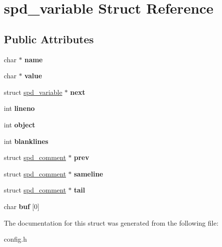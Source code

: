 \hypertarget{structspd__variable}{
\section{spd\_\-variable Struct Reference}
\label{structspd__variable}
}
\subsection*{Public Attributes}
\begin{DoxyCompactItemize}
\item 
\hypertarget{structspd__variable_a9d87b02dc765e30e70edbbe681cb464a}{
char $\ast$ {\bfseries name}}
\label{structspd__variable_a9d87b02dc765e30e70edbbe681cb464a}

\item 
\hypertarget{structspd__variable_a43fd519b2c586bde3521900c9402ad4d}{
char $\ast$ {\bfseries value}}
\label{structspd__variable_a43fd519b2c586bde3521900c9402ad4d}

\item 
\hypertarget{structspd__variable_a09127c15a879df4055e78611e1986871}{
struct \hyperlink{structspd__variable}{spd\_\-variable} $\ast$ {\bfseries next}}
\label{structspd__variable_a09127c15a879df4055e78611e1986871}

\item 
\hypertarget{structspd__variable_ab67c90992a62ec6db0c37273b832fc7a}{
int {\bfseries lineno}}
\label{structspd__variable_ab67c90992a62ec6db0c37273b832fc7a}

\item 
\hypertarget{structspd__variable_ad12a75d6fa0c8136c4627a652b603e65}{
int {\bfseries object}}
\label{structspd__variable_ad12a75d6fa0c8136c4627a652b603e65}

\item 
\hypertarget{structspd__variable_a3bbfe0e2281258146bdbebcd2414d741}{
int {\bfseries blanklines}}
\label{structspd__variable_a3bbfe0e2281258146bdbebcd2414d741}

\item 
\hypertarget{structspd__variable_ad63543a9398c53470120728207c14a65}{
struct \hyperlink{structspd__comment}{spd\_\-comment} $\ast$ {\bfseries prev}}
\label{structspd__variable_ad63543a9398c53470120728207c14a65}

\item 
\hypertarget{structspd__variable_a263f648015466b04c18f8e86b91274b3}{
struct \hyperlink{structspd__comment}{spd\_\-comment} $\ast$ {\bfseries sameline}}
\label{structspd__variable_a263f648015466b04c18f8e86b91274b3}

\item 
\hypertarget{structspd__variable_a4100c91101957db2890c234682f9be40}{
struct \hyperlink{structspd__comment}{spd\_\-comment} $\ast$ {\bfseries tail}}
\label{structspd__variable_a4100c91101957db2890c234682f9be40}

\item 
\hypertarget{structspd__variable_afd3fdec76ce48a75dd8a630ea39d4451}{
char {\bfseries buf} \mbox{[}0\mbox{]}}
\label{structspd__variable_afd3fdec76ce48a75dd8a630ea39d4451}

\end{DoxyCompactItemize}


The documentation for this struct was generated from the following file:\begin{DoxyCompactItemize}
\item 
config.h\end{DoxyCompactItemize}
